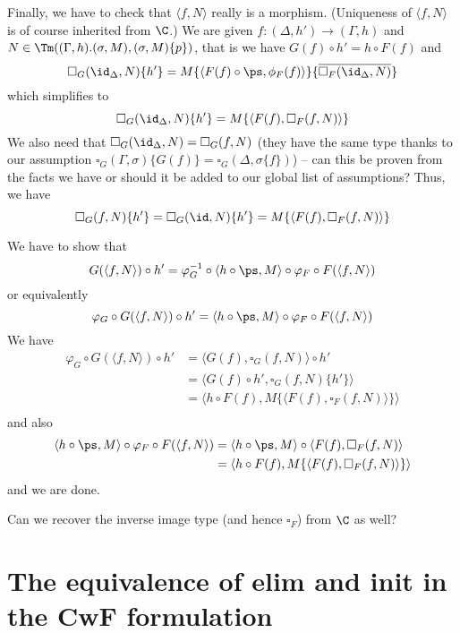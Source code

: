 \documentclass{article}
\newcommand{\isoFL}{\ensuremath{\phi_{F}}} %
\begin{document}
Finally, we have to check that $\langle f, N \rangle$ really is a
morphism. (Uniqueness of $\langle f, N\rangle$ is of course inherited
from $\C$.)  We are given $f : (\Delta, h') \to (\Gamma, h)$ and $N
\in \Tm((\Gamma, h).(\sigma, M), (\sigma, M)\{p\})$, that is we have
$G(f) \circ h' = h \circ F(f)$ and
\[
\square_G(\id_{\Delta}, N)\{h'\} = M\{\langle F(f) \circ \ps, \isoFL(f)\rangle\}\{\overline{\square_F(\id_{\Delta}, N)}\}
\]
which simplifies to
\[
\square_G(\id_{\Delta}, N)\{h'\} = M\{\langle F(f), \square_F(f, N)\rangle\}
\]
We also need that $\square_G(\id_{\Delta}, N) = \square_G(f, N)$ (they
have the same type thanks to our assumption $\square_G(\Gamma,
\sigma)\{G(f)\} = \square_G(\Delta, \sigma\{f\})$) -- can this be
proven from the facts we have or should it be added to our global list
of assumptions? Thus, we have
\[
\square_G(f, N)\{h'\} = \square_G(\id, N)\{h'\} = M\{\langle F(f), \square_F(f, N)\rangle\}
\]

We have to show that
\[
G(\langle f, N\rangle) \circ h' = \varphi_G^{-1} \circ \langle h \circ \ps, M\rangle \circ \varphi_F \circ F(\langle f, N\rangle)
\]
or equivalently
\[
\varphi_G \circ G(\langle f, N\rangle) \circ h' = \langle h \circ \ps, M\rangle \circ \varphi_F \circ F(\langle f, N\rangle)
\]
We have
\begin{align*}
  \varphi_G \circ G(\langle f, N\rangle) \circ h'
 &= \langle G(f), \square_G(f, N)\rangle \circ h' \\
 &= \langle G(f) \circ h', \square_G(f, N)\{h'\}\rangle \\
 &= \langle h \circ F(f), M\{\langle F(f), \square_F(f, N)\rangle\}\rangle \\
\end{align*}
and also
\begin{align*}
  \langle h \circ \ps, M\rangle \circ \varphi_F \circ F(\langle f, N\rangle)
 &= \langle h \circ \ps, M\rangle \circ \langle F(f), \square_F(f, N)\rangle \\
 &= \langle h \circ F(f), M\{\langle F(f), \square_F(f, N)\rangle\}\rangle \\
\end{align*}
and we are done.

\begin{question}
  Can we recover the inverse image type (and hence $\square_F$) from
  $\C$ as well?
\end{question}

\section{The equivalence of elim and init in the CwF formulation}
\end{document}
